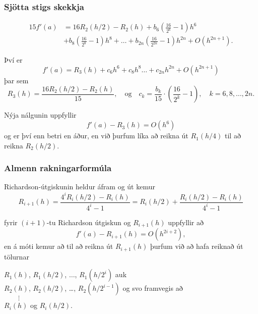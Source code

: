 \documentclass[icelandic,a4paper,12pt]{article}
\begin{document}
\subsubsection{Sjötta stigs skekkja} 
\begin{align*}
  15f'(a) &= 16 R_2(h/2) - R_2(h) 
  + b_6 \left( \frac{16}{2^6} - 1 \right) h^6 \\
  &+ b_8 \left( \frac{16}{2^8} - 1 \right) h^8
  + \ldots
  + b_{2n} \left( \frac{16}{2^{2n}} - 1 \right) h^{2n}
  + O(h^{2n+1}).
\end{align*}

\pause
Því er
\begin{equation*}
  f'(a) = R_3(h) + c_6 h^6 + c_8 h^8 \ldots + c_{2n} h^{2n}
  + O(h^{2n+1})
\end{equation*}
þar sem
\begin{equation*}
  R_3(h) = \frac{16 R_2(h/2) - R_2(h)}{15},
  \quad \text{og} \quad
  c_k = \frac{b_k}{15} \cdot \left( \frac{16}{2^k} - 1 \right),
  \quad k = 6,8,\ldots,2n.
\end{equation*}

\pause
Nýja nálgunin uppfyllir
\begin{equation*}
  f'(a) - R_3(h) = O(h^6)
\end{equation*}
og er því enn betri en áður, en við þurfum líka að reikna út
$R_1(h/4)$ til að reikna $R_2(h/2)$. 



\subsubsection{Almenn rakningarformúla} 
Richardson-útgiskunin heldur áfram og út kemur
\begin{equation*}
  R_{i+1}(h) = \frac{4^i R_i(h/2) - R_i(h)}{4^i-1}
  = R_i(h/2) + \frac{R_i(h/2)-R_i(h)}{4^i-1}
\end{equation*}

fyrir $(i+1)$-tu Richardson útgiskun og $R_{i+1}(h)$ uppfyllir að
\begin{equation*}
  f'(a) - R_{i+1}(h) = O(h^{2i+2}),
\end{equation*}
en á móti kemur að til að reikna út $R_{i+1}(h)$ þurfum við að hafa
reiknað út tölurnar 

$R_1(h)$, $R_1(h/2)$, $\ldots$, $R_1(h/2^i)$ auk \\
$R_2(h)$, $R_2(h/2)$, \ldots, $R_2(h/2^{i-1})$ og svo framvegis að\\
$\qquad \vdots$ \\
$R_i(h)$ og $R_i(h/2)$. 
\end{document}
